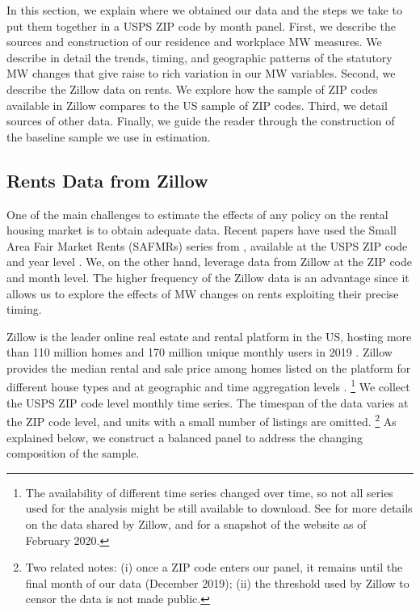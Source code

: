 
In this section, we explain where we obtained our data and the steps we take to 
put them together in a USPS ZIP code by month panel.
First, we describe the sources and construction of our residence and workplace 
MW measures.
We describe in detail the trends, timing, and geographic patterns of the 
statutory MW changes that give raise to rich variation in our MW variables.
Second, we describe the Zillow data on rents.
We explore how the sample of ZIP codes available in Zillow compares to the US 
sample of ZIP codes.
Third, we detail sources of other data.
Finally, we guide the reader through the construction of the baseline sample we
use in estimation.

\subsection{Rents Data from Zillow}

One of the main challenges to estimate the effects of any policy on the rental
housing market is to obtain adequate data.
Recent papers have used the Small Area Fair Market Rents (SAFMRs) series from 
\textcite{hudSAFMR}, available at the USPS ZIP code and year level 
\parencite{Tidemann2018, Yamagishi2019}.
We, on the other hand, leverage data from Zillow at the ZIP code and month level.
The higher frequency of the Zillow data is an advantage since it allows us to 
explore the effects of MW changes on rents exploiting their precise timing.

Zillow is the leader online real estate and rental platform in the US, hosting
more than 110 million homes and 170 million unique monthly users in 2019 
\parencite{ZillowFacts}.
Zillow provides the median rental and sale price among homes listed on the 
platform for different house types and at geographic and time aggregation 
levels \parencite{ZillowData}.%
\footnote{The availability of different time series changed over time, so not 
all series used for the analysis might be still available to download.
See \textcite{ZillowData} for more details on the data shared by Zillow, and 
\textcite{ZillowDataArchive} for a snapshot of the website as of February 2020.} 
We collect the USPS ZIP code level monthly time series.
The timespan of the data varies at the ZIP code level, and units with a small 
number of listings are omitted.%
\footnote{Two related notes:
(i) once a ZIP code enters our panel, it remains until the final month of our 
data (December 2019);
(ii) the threshold used by Zillow to censor the data is not made public.}
As explained below, we construct a balanced panel to address the changing 
composition of the sample.

